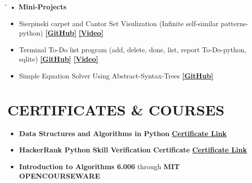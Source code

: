 \documentclass{res}[12pt]
\begin{document}
\begin{resume}
\begin{itemize}
	\end{itemize}
	\vspace{-0.2in}

   \begin{tabbing}
   \hspace{1.5in}\= \hspace{3.0in}\= \kill %
	   {\bf \large{• Mini-Projects}} 
   \end{tabbing}\vspace{-8pt}      %
   		\begin{itemize}
			\item Sierpinski carpet and Cantor Set Visulization (Infinite self-similar
				patterns-python)
				\hspace{6.9mm}
					 \>\href{https://github.com/mukul1729/fractal-visualizer}{\uline{\textbf{[GitHub]}}}
				\hspace{8.6mm}
					 \>\href{https://vimeo.com/567633842}{\uline{\textbf{[Video]}}}
				 \item Terminal To-Do list program (add, delete, done, list, report
					 To-Do-python, sqlite)
				\hspace{10.4mm}
					\>\href{https://github.com/mukul1729/todo-list}{\uline{\textbf{[GitHub]}}}
				\hspace{8.6mm}
					 \>\href{https://vimeo.com/566783496}{\uline{\textbf{[Video]}}}
			\item Simple Equation Solver Using Abstract-Syntax-Trees
				\hspace{51.4mm}
				\>\href{https://github.com/mukul1729/equation-solver}{\uline{\textbf{[GitHub]}}}
   		\end{itemize}
 
 
\section{\large{CERTIFICATES \& COURSES}}
	\begin{itemize}
		\item{\textbf{Data Structures and Algorithms in Python}}
		\hspace{13.4mm}
		\href{https://www/udemy.com/certificate/UC-10569178-738a-4669-8ba0-ae1d6a3934e7/}{\uline{\textbf{Certificate Link}}}
	   \item{\textbf{HackerRank Python Skill Verification Certificate}}
		\hspace{3.6mm}
		\href{https://www.hackerrank.com/certificates/50636fc435a0}{\uline{\textbf{Certificate Link}}}
	\item{\textbf{Introduction to Algorithms 6.006 }through  \textbf{MIT OPENCOURSEWARE}}
	\end{itemize}


\end{resume}
\end{document}
